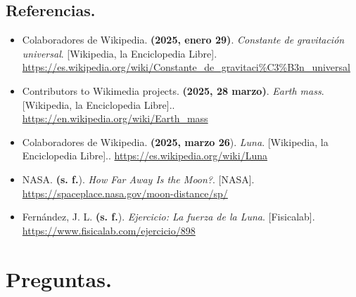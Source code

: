 \documentclass[12pt,letterpaper]{article}
\begin{document}
\subsection*{Referencias.}

\begin{itemize}
\item Colaboradores de Wikipedia. \textbf{(2025, enero 29)}. \textit{Constante de gravitación universal}. [Wikipedia, la Enciclopedia Libre]. \url{https://es.wikipedia.org/wiki/Constante_de_gravitaci%C3%B3n_universal}
  
\item Contributors to Wikimedia projects. \textbf{(2025, 28 marzo)}. \textit{Earth mass}. [Wikipedia, la Enciclopedia Libre].. \url{https://en.wikipedia.org/wiki/Earth_mass}
  
\item Colaboradores de Wikipedia. \textbf{(2025, marzo 26}). \textit{Luna}. [Wikipedia, la Enciclopedia Libre].. \url{https://es.wikipedia.org/wiki/Luna}
  
\item NASA. \textbf{(s. f.}). \textit{How Far Away Is the Moon?}. [NASA]. \url{https://spaceplace.nasa.gov/moon-distance/sp/}
  
\item Fernández, J. L. \textbf{(s. f.}). \textit{Ejercicio: La fuerza de la Luna}. [Fisicalab]. \url{https://www.fisicalab.com/ejercicio/898}
  
\end{itemize}

\newpage

\section*{Preguntas.}
\end{document}

